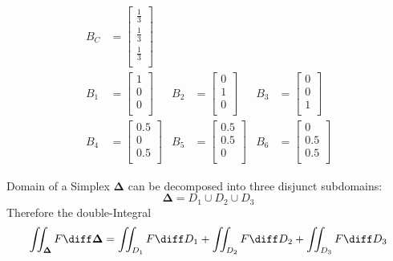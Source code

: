 \documentclass{mitschrift}
\begin{document}
\begin{align}
    B_C &= \begin{bmatrix}
        \frac{1}{3} \\
        \frac{1}{3} \\
        \frac{1}{3} \\
    \end{bmatrix} \label{eqn:characteristicPoint1}\\ 
    B_1 &= \begin{bmatrix}
        1 \\
        0 \\
        0 \\
    \end{bmatrix}& B_2 &= \begin{bmatrix}
        0 \\
        1 \\
        0 \\
    \end{bmatrix}& B_3 &= \begin{bmatrix}
        0 \\
        0 \\
        1 \\
    \end{bmatrix} \label{eqn:characteristicPoint2}\\
    B_4 &= \begin{bmatrix}
        0.5 \\
        0 \\
        0.5 \\
    \end{bmatrix}& 
    B_5 &= \begin{bmatrix}
        0.5 \\
        0.5 \\
        0 \\
    \end{bmatrix}& 
    B_6 &= \begin{bmatrix}
        0 \\
        0.5 \\
        0.5 \\
    \end{bmatrix} \label{eqn:characteristicPoint3}
\end{align}

Domain of a Simplex $\boldsymbol{\Delta}$ can be decomposed into three disjunct subdomains: \begin{equation}
    \boldsymbol{\Delta} = D_1 \cup D_2 \cup D_3
\end{equation}
Therefore the double-Integral \begin{equation}
    \iint_{\boldsymbol{\Delta}} F \diff \boldsymbol{\Delta} = \iint_{D_1} F \diff D_1 + \iint_{D_2} F \diff D_2 + \iint_{D_3} F \diff D_3
\end{equation}
\end{document}
